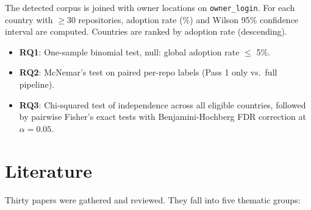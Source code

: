 \documentclass[11pt,a4paper]{article}
\begin{document}
The detected corpus is joined with owner locations on \texttt{owner\_login}. For each
country with $\geq$30 repositories, adoption rate (\%) and Wilson 95\% confidence interval
are computed. Countries are ranked by adoption rate (descending).

\begin{itemize}
    \item \textbf{RQ1}: One-sample binomial test, null: global adoption rate $\leq$ 5\%.
    \item \textbf{RQ2}: McNemar's test on paired per-repo labels (Pass 1 only vs.\ full pipeline).
    \item \textbf{RQ3}: Chi-squared test of independence across all eligible countries,
          followed by pairwise Fisher's exact tests with Benjamini-Hochberg FDR correction
          at $\alpha = 0.05$.
\end{itemize}

\section{Literature}

Thirty papers were gathered and reviewed. They fall into five thematic groups:
\end{document}
